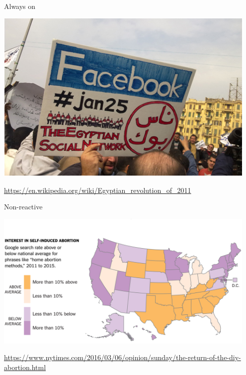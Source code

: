 \documentclass{beamer}
\def\vf{\vfill}
\begin{document}
\begin{frame}{Always on}

\begin{center}
	\includegraphics[width=0.95\textwidth]{figures/egypt-arab-spring-facebook-twitter.png}
\end{center}

\vf
\tiny{\url{https://en.wikipedia.org/wiki/Egyptian_revolution_of_2011}}

\end{frame}

\begin{frame}{Non-reactive}

\begin{center}
	\includegraphics[width=0.95\textwidth]{figures/abortions-at-clinics-or-somewhere-else-1457138970171-facebookJumbo.png}
\end{center}

\vf
\tiny{\url{https://www.nytimes.com/2016/03/06/opinion/sunday/the-return-of-the-diy-abortion.html}}

\end{frame}
\end{document}
